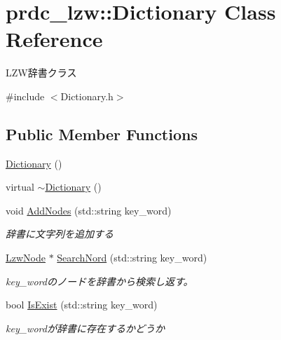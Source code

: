 \hypertarget{classprdc__lzw_1_1Dictionary}{\section{prdc\-\_\-lzw\-:\-:Dictionary Class Reference}
\label{classprdc__lzw_1_1Dictionary}
}


L\-Z\-W辞書クラス  




{\ttfamily \#include $<$Dictionary.\-h$>$}

\subsection*{Public Member Functions}
\begin{DoxyCompactItemize}
\item 
\hyperlink{classprdc__lzw_1_1Dictionary_a7a53efd7967e59748f321938aa983368}{Dictionary} ()
\item 
virtual \hyperlink{classprdc__lzw_1_1Dictionary_a953fce0e9128a8e48b62779fdefcc051}{$\sim$\-Dictionary} ()
\item 
void \hyperlink{classprdc__lzw_1_1Dictionary_a1eb03039cfef0b86a1198bd256a7f057}{Add\-Nodes} (std\-::string key\-\_\-word)
\begin{DoxyCompactList}\small\item\em 辞書に文字列を追加する \end{DoxyCompactList}\item 
\hyperlink{classprdc__lzw_1_1LzwNode}{Lzw\-Node} $\ast$ \hyperlink{classprdc__lzw_1_1Dictionary_a7e292cd6ceadd969caed403db3a05483}{Search\-Nord} (std\-::string key\-\_\-word)
\begin{DoxyCompactList}\small\item\em key\-\_\-wordのノードを辞書から検索し返す。 \end{DoxyCompactList}\item 
bool \hyperlink{classprdc__lzw_1_1Dictionary_acfa8394907b51708efd8009ee0c5269f}{Is\-Exist} (std\-::string key\-\_\-word)
\begin{DoxyCompactList}\small\item\em key\-\_\-wordが辞書に存在するかどうか \end{DoxyCompactList}\end{DoxyCompactItemize}
